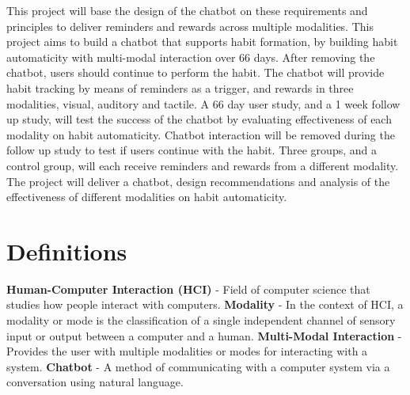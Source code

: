 This project will base the design of the chatbot on these requirements and principles to deliver reminders and rewards across multiple modalities.\newline
\newline
This project aims to build a chatbot that supports habit formation, by building habit automaticity with multi-modal interaction over 66 days. After removing the chatbot, users should continue to perform the habit. The chatbot will provide habit tracking by means of reminders as a trigger, and rewards in three modalities, visual, auditory and tactile. A 66 day user study, and a 1 week follow up study, will test the success of the chatbot by evaluating effectiveness of each modality on habit automaticity. Chatbot interaction will be removed during the follow up study to test if users continue with the habit. Three groups, and a control group, will each receive reminders and rewards from a different modality.\newline
\newline
The project will deliver a chatbot, design recommendations and analysis of the effectiveness of different modalities on habit automaticity.

\newpage

\section*{Definitions}

\textbf{Human-Computer Interaction (HCI)} - Field of computer science that studies how people interact with computers.\newline
\newline
\textbf{Modality} - In the context of HCI, a modality or mode is the classification of a single independent channel of sensory input or output between a computer and a human.\newline
\newline
\textbf{Multi-Modal Interaction} - Provides the user with multiple modalities or modes for interacting with a system.\newline
\newline
\textbf{Chatbot} - A method of communicating with a computer system via a conversation using natural language.

\newpage
